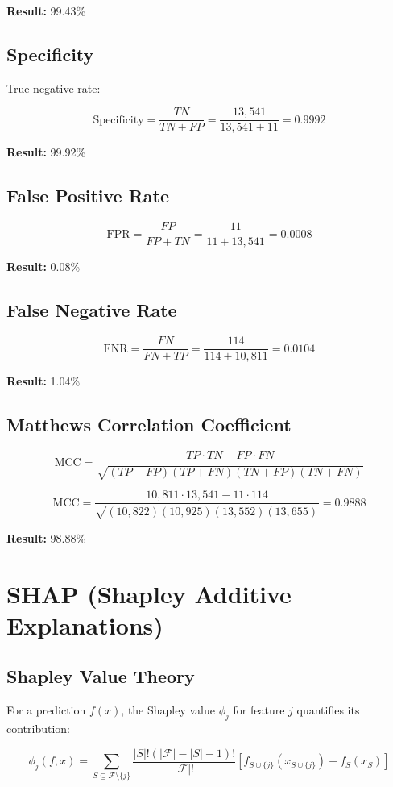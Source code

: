 \documentclass[12pt,a4paper]{article}
\begin{document}
\textbf{Result:} 99.43\%

\subsection{Specificity}

True negative rate:

$$\text{Specificity} = \frac{TN}{TN + FP} = \frac{13{,}541}{13{,}541 + 11} = 0.9992$$

\textbf{Result:} 99.92\%

\subsection{False Positive Rate}

$$\text{FPR} = \frac{FP}{FP + TN} = \frac{11}{11 + 13{,}541} = 0.0008$$

\textbf{Result:} 0.08\%

\subsection{False Negative Rate}

$$\text{FNR} = \frac{FN}{FN + TP} = \frac{114}{114 + 10{,}811} = 0.0104$$

\textbf{Result:} 1.04\%

\subsection{Matthews Correlation Coefficient}

$$\text{MCC} = \frac{TP \cdot TN - FP \cdot FN}{\sqrt{(TP+FP)(TP+FN)(TN+FP)(TN+FN)}}$$

$$\text{MCC} = \frac{10{,}811 \cdot 13{,}541 - 11 \cdot 114}{\sqrt{(10{,}822)(10{,}925)(13{,}552)(13{,}655)}} = 0.9888$$

\textbf{Result:} 98.88\%

\section{SHAP (Shapley Additive Explanations)}

\subsection{Shapley Value Theory}

For a prediction $f(x)$, the Shapley value $\phi_j$ for feature $j$ quantifies its contribution:

$$\phi_j(f, x) = \sum_{S \subseteq \mathcal{F} \setminus \{j\}} \frac{|S|! (|\mathcal{F}| - |S| - 1)!}{|\mathcal{F}|!} [f_{S \cup \{j\}}(x_{S \cup \{j\}}) - f_S(x_S)]$$
\end{document}
